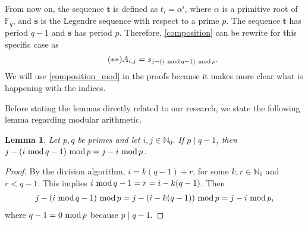 \documentclass[12pt]{article}
\renewcommand{\mod}{\ \textup{mod}\,}
\newtheorem{lemma}[theorem]{Lemma}
\theoremstyle{definition}
\theoremstyle{definition}
\theoremstyle{definition}
\theoremstyle{plain}
\theoremstyle{plain}
\numberwithin{equation}{section}
\begin{document}
From now on, the sequence $\mathbf{t}$ is defined as $t_i = \alpha^i$, where $\alpha$ is a primitive root of $\mathbb{F}_q$, and $\mathbf{s}$ is the Legendre sequence with respect to a prime $p$. 
The sequence $\mathbf{t}$ has period $q-1$ and $\mathbf{s}$ has period $p$. 
Therefore, \cref{composition} can be rewrite for this specific case as
\begin{align}\label{composition_mod}\tag{$**$}
    A_{i,j} = s_{j-(i \mod q-1) \mod p}.
\end{align}
We will use \cref{composition_mod} in the proofs because it makes more clear what is happening with the indices. 

Before stating the lemmas directly related to our research, we state the following lemma regarding modular arithmetic.
 
\begin{lemma}\label{mod_lemma}
    Let $p,q$ be primes and let $i,j\in \mathbb{N}_0$. 
    If $p \mid q-1$, then $j-(i\mod q-1) \mod p = j-i \mod p$.
\end{lemma}
\begin{proof}
    By the division algorithm, $i = k(q-1) + r$, for some $k,r\in\mathbb{N}_0$ and $r<q-1$.
    This implies $i \mod q-1 = r = i-k(q-1)$.
    Then 
    \begin{align*}
        j-(i\mod q-1) \mod p = j - (i - k(q-1)) \mod p = j-i \mod p,
    \end{align*}
    where $q-1 = 0 \mod p$ because $p \mid q-1$.
\end{proof}
\end{document}
